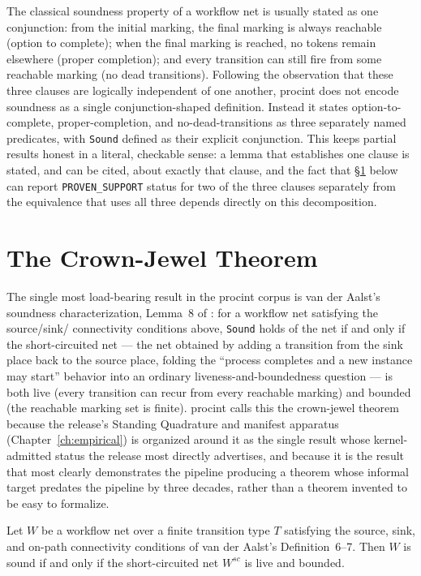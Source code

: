 The classical soundness property of a workflow net is usually stated as
one conjunction: from the initial marking, the final marking is always
reachable (option to complete); when the final marking is reached, no
tokens remain elsewhere (proper completion); and every transition can
still fire from some reachable marking (no dead transitions). Following
the observation that these three clauses are logically independent of one
another, \textsf{procint} does not encode soundness as a single
conjunction-shaped definition. Instead it states option-to-complete,
proper-completion, and no-dead-transitions as three separately named
predicates, with \texttt{Sound} defined as their explicit conjunction.
This keeps partial results honest in a literal, checkable sense: a lemma
that establishes one clause is stated, and can be cited, about exactly
that clause, and the fact that \S\ref{sec:procint-crown} below can report
\texttt{PROVEN\_SUPPORT} status for two of the three clauses separately
from the equivalence that uses all three depends directly on this
decomposition.

\section{The Crown-Jewel Theorem}
\label{sec:procint-crown}

The single most load-bearing result in the \textsf{procint} corpus is van
der Aalst's soundness characterization, Lemma~8 of
\cite{vanderaalst1997}: for a workflow net satisfying the source/sink/
connectivity conditions above, \texttt{Sound} holds of the net if and only
if the short-circuited net --- the net obtained by adding a transition
from the sink place back to the source place, folding the ``process
completes and a new instance may start'' behavior into an ordinary
liveness-and-boundedness question --- is both live (every transition can
recur from every reachable marking) and bounded (the reachable marking
set is finite). \textsf{procint} calls this the crown-jewel theorem
because the release's Standing Quadrature and manifest apparatus
(Chapter~\ref{ch:empirical}) is organized around it as the single result
whose kernel-admitted status the release most directly advertises, and
because it is the result that most clearly demonstrates the pipeline
producing a theorem whose informal target predates the pipeline by three
decades, rather than a theorem invented to be easy to formalize.

\begin{theorem}
\label{thm:crown-informal}
Let \(W\) be a workflow net over a finite transition type \(T\) satisfying
the source, sink, and on-path connectivity conditions of van der Aalst's
Definition~6--7. Then \(W\) is sound if and only if the short-circuited
net \(W^{sc}\) is live and bounded.
\end{theorem}

